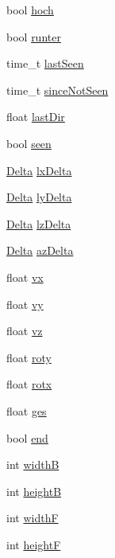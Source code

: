 \begin{DoxyCompactItemize}
bool \hyperlink{class_cglobal_a57b8d93cd26f7c778c719ad21bc5528b}{hoch}
\item 
bool \hyperlink{class_cglobal_a3198b29c259c188b0938b4fb5731409b}{runter}
\item 
time\_\-t \hyperlink{class_cglobal_a1d338ed39494adfbee95a883369e5f4a}{lastSeen}
\item 
time\_\-t \hyperlink{class_cglobal_abb1e0f2a241a8d9131098cf823b45f64}{sinceNotSeen}
\item 
float \hyperlink{class_cglobal_a3ab9e8044e12c2927366e5402b5e3c09}{lastDir}
\item 
bool \hyperlink{class_cglobal_afe6f01a7ff64a3de6d0c8612f36511fd}{seen}
\item 
\hyperlink{class_delta}{Delta} \hyperlink{class_cglobal_ae826fb1d5b65ba58163f25517431e505}{lxDelta}
\item 
\hyperlink{class_delta}{Delta} \hyperlink{class_cglobal_a42b74fa677f900102efb348d7189ca3c}{lyDelta}
\item 
\hyperlink{class_delta}{Delta} \hyperlink{class_cglobal_aaff1f24cae62247123759d5142d5f69a}{lzDelta}
\item 
\hyperlink{class_delta}{Delta} \hyperlink{class_cglobal_a4a7fa181ec17c448e6f7ef4d7213789b}{azDelta}
\item 
float \hyperlink{class_cglobal_abafbed62176301706747c04ef3046aae}{vx}
\item 
float \hyperlink{class_cglobal_a0967372a0ede7b8b9a24957df663b7b3}{vy}
\item 
float \hyperlink{class_cglobal_af9ef9759f83ae67b7e220570a7738ef5}{vz}
\item 
float \hyperlink{class_cglobal_a5c1fac565d3813e798bd6aeb1c6fc8aa}{roty}
\item 
float \hyperlink{class_cglobal_ad295728f5113d9a47527cf14262dea0e}{rotx}
\item 
float \hyperlink{class_cglobal_a478c0d94a8f8a7675d3e88e85742c81a}{ges}
\item 
bool \hyperlink{class_cglobal_a24fbb5c4b0ddab650375d08ba677b3f1}{end}
\item 
int \hyperlink{class_cglobal_a3adbbe83dbdab17a3506572de5444d14}{widthB}
\item 
int \hyperlink{class_cglobal_ae1a1fde7d947c2c7d32bc7f76599b054}{heightB}
\item 
int \hyperlink{class_cglobal_add77c33bb751ff75fc5e6bc0409d4540}{widthF}
\item 
int \hyperlink{class_cglobal_ac4dace71dbed15b75354e5ff327af75f}{heightF}
\end{DoxyCompactItemize}
